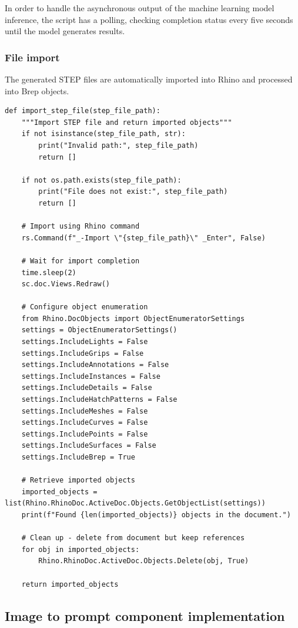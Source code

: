 In order to handle the asynchronous output of the machine learning model inference, the script has a polling, checking completion status every five seconds until the model generates results.

\subsubsection{File import}

The generated STEP files are automatically imported into Rhino and processed into Brep objects.

\begin{verbatim}
def import_step_file(step_file_path):
    """Import STEP file and return imported objects"""
    if not isinstance(step_file_path, str):
        print("Invalid path:", step_file_path)
        return []

    if not os.path.exists(step_file_path):
        print("File does not exist:", step_file_path)
        return []

    # Import using Rhino command
    rs.Command(f"_-Import \"{step_file_path}\" _Enter", False)
    
    # Wait for import completion
    time.sleep(2)  
    sc.doc.Views.Redraw()

    # Configure object enumeration
    from Rhino.DocObjects import ObjectEnumeratorSettings
    settings = ObjectEnumeratorSettings()
    settings.IncludeLights = False
    settings.IncludeGrips = False
    settings.IncludeAnnotations = False
    settings.IncludeInstances = False
    settings.IncludeDetails = False
    settings.IncludeHatchPatterns = False
    settings.IncludeMeshes = False
    settings.IncludeCurves = False
    settings.IncludePoints = False
    settings.IncludeSurfaces = False
    settings.IncludeBrep = True  

    # Retrieve imported objects
    imported_objects = list(Rhino.RhinoDoc.ActiveDoc.Objects.GetObjectList(settings))
    print(f"Found {len(imported_objects)} objects in the document.")

    # Clean up - delete from document but keep references
    for obj in imported_objects:
        Rhino.RhinoDoc.ActiveDoc.Objects.Delete(obj, True)  

    return imported_objects
\end{verbatim}

\subsection{Image to prompt component implementation}

